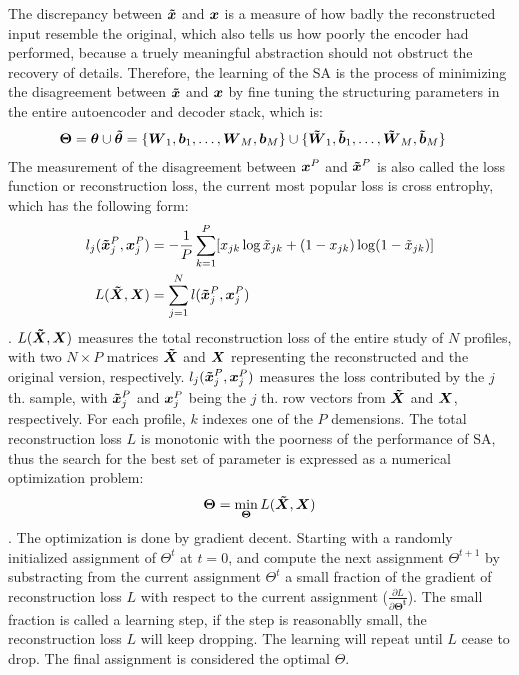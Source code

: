 The discrepancy between $\boldsymbol{\tilde{x}}$ and $\boldsymbol{x}$ is a measure of how badly the reconstructed input resemble the original, which also tells us how poorly the encoder had performed, because a truely meaningful abstraction should not obstruct the recovery of details. Therefore, the learning of the SA is the process of minimizing the disagreement between $\boldsymbol{\tilde{x}}$ and $\boldsymbol{x}$ by fine tuning the structuring parameters in the entire autoencoder and decoder stack, which is:
\begin{equation} \label{eq:PAR}
\begin{split}
  \boldsymbol{\Theta} &= \boldsymbol{\theta} \cup \boldsymbol{\tilde{\theta}} = \{\boldsymbol{W}_1, \boldsymbol{b}_1, \dots, \boldsymbol{W}_M, \boldsymbol{b}_M \} \cup \{\boldsymbol{\tilde{W}}_1, \boldsymbol{\tilde{b}}_1, \dots, \boldsymbol{\tilde{W}}_M, \boldsymbol{\tilde{b}}_M\}
\end{split}
\end{equation}
The measurement of the disagreement between $\boldsymbol{x}^P$ and $\boldsymbol{\tilde{x}}^P$ is also called the loss function or reconstruction loss, the current most popular loss is cross entrophy, which has the following form:
\begin{equation} \label{eq:CE}
\begin{split}
  l_j(\boldsymbol{\tilde{x}}_j^P, \boldsymbol{x}_j^P) &= -\frac{1}{P}\sum_{k=1}^P[x_{jk}\log{\tilde{x}_{jk}}+(1-x_{jk})\log(1-\tilde{x}_{jk})] \\
  L(\boldsymbol{\tilde{X}}, \boldsymbol{X}) &= \sum_{j=1}^{N}{l(\boldsymbol{\tilde{x}}_j^P, \boldsymbol{x}_j^P)}
\end{split}
\end{equation}.
$L(\boldsymbol{\tilde{X}}, \boldsymbol{X})$ measures the total reconstruction loss of the entire study of $N$ profiles, with two $N \times P$ matrices $\boldsymbol{\tilde{X}}$ and $\boldsymbol{X}$ representing the reconstructed and the original version, respectively. $l_j(\boldsymbol{\tilde{x}}_j^P, \boldsymbol{x}_j^P)$ measures the loss contributed by the $j$ th. sample, with $\boldsymbol{\tilde{x}}_j^P$ and $\boldsymbol{x}_j^P$ being the $j$ th. row vectors from $\boldsymbol{\tilde{X}}$ and $\boldsymbol{X}$, respectively. For each profile, $k$ indexes one of the $P$ demensions. The total reconstruction loss $L$ is monotonic with the poorness of the performance of SA, thus the search for the best set of parameter is expressed as a numerical optimization problem:
\[ \boldsymbol{\Theta} = \min_{\boldsymbol{\Theta}} L(\boldsymbol{\tilde{X}}, \boldsymbol{X}) \].
The optimization is done by gradient decent. Starting with a randomly initialized assignment of $\Theta^t$ at $t=0$, and compute the next assignment $\Theta^{t+1}$ by substracting from the current assignment $\Theta^t$ a small fraction of the gradient of reconstruction loss $L$ with respect to the current assignment ($\frac{\partial L}{\partial \boldsymbol{\Theta^{t}}}$). The small fraction is called a learning step, if the step is reasonablly small, the reconstruction loss $L$ will keep dropping. The learning will repeat until $L$ cease to drop. The final assignment is considered the optimal $\Theta$. 

